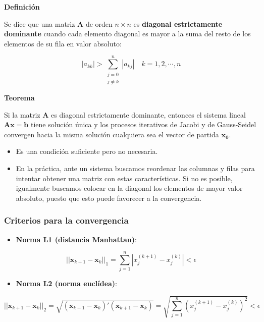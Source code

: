 \documentclass[openany]{book}
\providecommand{\tightlist}{%
  \setlength{\itemsep}{0pt}\setlength{\parskip}{0pt}}
\begin{document}
\textbf{Definición}

Se dice que una matriz \(\mathbf{A}\) de orden \(n \times n\) es \textbf{diagonal estrictamente dominante} cuando cada elemento diagonal es mayor a la suma del resto de los elementos de su fila en valor absoluto:

\[
|a_{kk}| > \sum\limits_{\substack{j=0 \\ j\neq k}}^n |a_{kj}| \quad k=1, 2, \cdots, n
\]

\textbf{Teorema}

Si la matriz \(\mathbf{A}\) es diagonal estrictamente dominante, entonces el sistema lineal \(\mathbf{Ax=b}\) tiene solución única y los procesos iterativos de Jacobi y de Gauss-Seidel convergen hacia la misma solución cualquiera sea el vector de partida \(\mathbf{x_0}\).

\begin{itemize}
\tightlist
\item
  Es una condición suficiente pero no necesaria.
\item
  En la práctica, ante un sistema buscamos reordenar las columnas y filas para intentar obtener una matriz con estas características. Si no es posible, igualmente buscamos colocar en la diagonal los elementos de mayor valor absoluto, puesto que esto puede favorecer a la convergencia.
\end{itemize}

\hypertarget{criterios-para-la-convergencia}{%
\subsubsection*{Criterios para la convergencia}\label{criterios-para-la-convergencia}}

\begin{itemize}
\tightlist
\item
  \textbf{Norma L1 (distancia Manhattan)}:
\end{itemize}

\[
||\mathbf{x}_{k+1}-\mathbf{x}_{k}||_1 =\sum_{j=1}^n |x_j^{(k+1)} - x_j^{(k)}| < \epsilon
\]

\begin{itemize}
\tightlist
\item
  \textbf{Norma L2 (norma euclídea)}:
\end{itemize}

\[||\mathbf{x}_{k+1}-\mathbf{x}_{k}||_2 = \sqrt{(\mathbf{x}_{k+1}-\mathbf{x}_{k})'(\mathbf{x}_{k+1}-\mathbf{x}_{k})} = \sqrt{\sum_{j=1}^n (x_j^{(k+1)} - x_j^{(k)})^2} < \epsilon\]
\end{document}
